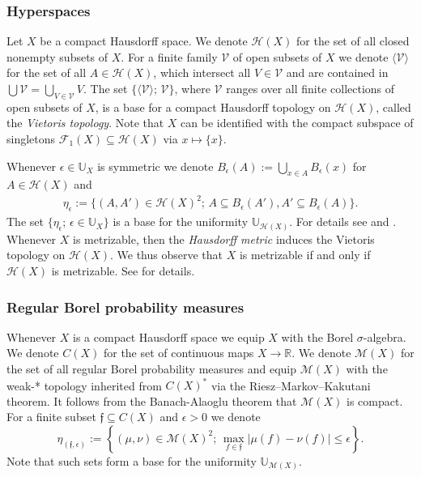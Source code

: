 \documentclass[12pt, reqno]{amsart}
\theoremstyle{definition}
\theoremstyle{remark}
\numberwithin{equation}{section}
\theoremstyle{theorem}
\theoremstyle{remark}
\def\finite{{\mathcal{F}}}
\def\hyper{{\mathcal{H}}}
\begin{document}
\subsubsection{Hyperspaces}
\label{subsubsec:prelims_topology_Hyperspaces}
Let $X$ be a compact Hausdorff space.
We denote $\hyper(X)$ for the set of all closed nonempty subsets of $X$.
For a finite family  $\mathcal{V}$ of open subsets of $X$ we denote 
$\langle \mathcal{V}\rangle$ for the set of all $A\in \hyper(X)$, which intersect all $V\in \mathcal{V}$ and are contained in $\bigcup \mathcal{V}=\bigcup_{V\in \mathcal{V}} V$. 
The set $\{\langle \mathcal{V} \rangle;\, \mathcal{V}\}$, where $\mathcal{V}$ ranges over all finite collections of open subsets of $X$, is a base for a compact Hausdorff topology on $\hyper(X)$, called the \emph{Vietoris topology}. 
Note that $X$ can be identified with the compact subspace of singletons $\finite_1(X)\subseteq \hyper(X)$ via $x\mapsto\{x\}$. 

Whenever $\epsilon\in \mathbb{U}_X$ is symmetric we denote $B_\epsilon(A):=\bigcup_{x\in A} B_\epsilon(x)$ for $A\in \hyper(X)$ and 
 \begin{align*}
    \eta_\epsilon
    :=\{(A,A')\in \hyper(X)^2;\, A\subseteq B_\epsilon(A'), A'\subseteq B_\epsilon(A)\}. 
\end{align*}
The set $\{\eta_\epsilon;\, \epsilon\in \mathbb{U}_X\}$ is a base for the uniformity $\mathbb{U}_{\hyper(X)}$. For details see 
\cite[Theorem~3.3]{michael1951topologies} %
and \cite[Section~8.5]{engelking1989general}. 
Whenever $X$ is metrizable, then the \emph{Hausdorff metric} induces the Vietoris topology on $\hyper(X)$. We thus observe that $X$ is metrizable if and only if $\hyper(X)$ is metrizable. 
See \cite[Section~I.2]{illanes1999hyperspaces} for details. 

\subsubsection{Regular Borel probability measures}
\label{subsubsec:prelims_topology_RegularBorelProbabilityMeasures}
Whenever $X$ is a compact Hausdorff space we equip $X$ with the Borel $\sigma$-algebra. 
We denote $C(X)$ for the set of continuous maps $X\to \mathbb{R}$. 
We denote $\mathcal{M}(X)$ for the set of all regular Borel probability measures and equip $\mathcal{M}(X)$ with the weak-* topology inherited from $C(X)^*$ via the Riesz–Markov–Kakutani theorem. 
It follows from the Banach-Alaoglu theorem that $\mathcal{M}(X)$ is compact. 
For a finite subset $\mathfrak{f}\subseteq C(X)$ and $\epsilon>0$ we denote 
\[\eta_{(\mathfrak{f},\epsilon)}:=\left\{(\mu,\nu)\in \mathcal{M}(X)^2;\, \max_{f\in \mathfrak{f}}|\mu(f)-\nu(f)|\leq\epsilon\right\}.\]
Note that such sets form a base for the uniformity $\mathbb{U}_{\mathcal{M}(X)}$.
\end{document}
